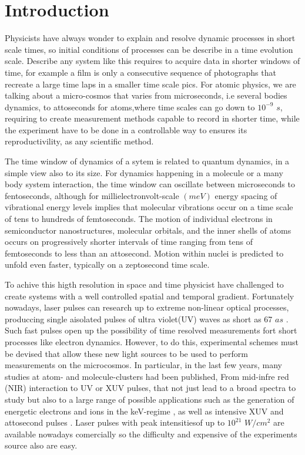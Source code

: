 \section{Introduction}

Physicists have always wonder to explain and resolve dynamic processes in short scale times, so initial conditions of processes can be  describe in a time  evolution scale. Describe any system like this requires to acquire data in shorter windows of time, for example a film is only a consecutive sequence of  photographs that recreate a large time laps in a smaller time scale pics. For  atomic physics, we are talking about a micro-cosmos that varies from microseconds, i.e several bodies dynamics, to  attoseconds  for atoms,where time scales can go down to $10^{-9}$ $s$, requiring to create measurement methods capable to record in shorter time, while the experiment have to be done in a controllable way to ensures its reproductivility, as any scientific method.

The time window of dynamics of a sytem is related to  quantum dynamics, in a simple view also to its size. For dynamics happening in a molecule or a many body system interaction, the time window can oscillate between  microseconds to fentoseconds, although for millielectronvolt-scale $(meV)$ energy spacing of vibrational energy levels implies that molecular vibrations occur on a time scale of tens to hundreds of femtoseconds. The motion of individual electrons in semiconductor nanostructures, molecular orbitals, and the inner shells of atoms occurs on progressively shorter intervals of time ranging from tens of femtoseconds to less than an attosecond. Motion within nuclei is predicted to unfold even faster, typically on a zeptosecond time scale.

To achive this higth resolution in space and  time physicist have challenged to create systems with a well controlled spatial and temporal gradient. Fortunately nowadays, laser pulses can research up to extreme non-linear optical processes, produccing single aisolated  pulses of ultra violet(UV) waves as short as 67 $as$ \cite{zhao_tailoring_2012}.  Such fast pulses open up the possibility of time resolved measurements fort short processes like electron dynamics.  However, to do this, experimental schemes must be devised that allow these new light sources to be used to perform measurements on the microcosmos. In particular, in the last few years,  many studies at atom- and molecule-clusters had been published, From mid-infre red (NIR) interaction to UV or XUV pulses, that not just lead to a broad spectra to study but also to a large range of possible applications such as the generation of  energetic electrons and ions in the keV-regime \cite{fennel_laser-driven_2010}, as well as intensive XUV and attosecond pulses \cite{stebbings_generation_2011}. Laser pulses with peak intensitiesof up to $10^{21}$ $W/cm^{2}$  are available nowadays \cite{mikaberidze_atomic_1981} comercially so the difficulty and expensive of the experiments source also are easy.

